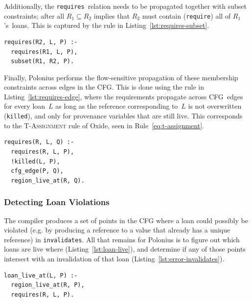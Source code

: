 \documentclass[11pt,a4paper,twoside,openany,draft]{report}
\newenvironment{sourcecode}{\captionsetup{type=listing}}{}
\newcommand{\InDatalog}[1]{\texttt{#1}}
\begin{document}
Additionally, the \InDatalog{requires}~relation needs to be propagated together
with subset constraints; after all $R_1 \subseteq R_2$ implies that $R_2$ must
contain (\InDatalog{require}) all of $R_1$'s~loans. This is captured by the rule
in Listing~\ref{lst:requires-subset}.

\begin{sourcecode}
  \label{lst:requires-subset}
\begin{verbatim}
requires(R2, L, P) :- 
  requires(R1, L, P), 
  subset(R1, R2, P).
\end{verbatim}
\end{sourcecode}

Finally, Polonius performs the flow-sensitive propagation of these membership
constraints across edges in the CFG. This is done using the rule in
Listing~\ref{lst:requires-edge}, where the requirements propagate across
CFG~edges for every loan~$L$ as long as the reference corresponding to~$L$ is
not overwritten (\InDatalog{killed}), and only for provenance variables that are
still live. This corresponds to the \textsc{T-Assignment} rule of Oxide, seen in
Rule~\eqref{eq:t-assignment}.

\begin{sourcecode}
  \label{lst:requires-edge}
\begin{verbatim}
requires(R, L, Q) :-
  requires(R, L, P),
  !killed(L, P),
  cfg_edge(P, Q),
  region_live_at(R, Q).
\end{verbatim}
\end{sourcecode}


\subsubsection{Detecting Loan Violations}

The compiler produces a set of points in the CFG where a loan could possibly be
violated (e.g. by producing a reference to a value that already has a unique
reference) in \InDatalog{invalidates}. All that remains for Polonius is to
figure out which loans are live where (Listing~\ref{lst:loan-live}), and
determine if any of those points intersect with an invalidation of that loan
(Listing~\ref{lst:error-invalidates}).

\begin{sourcecode}
  \label{lst:loan-live}
\begin{verbatim}
loan_live_at(L, P) :-
  region_live_at(R, P),
  requires(R, L, P).
\end{verbatim}
\end{sourcecode}
\end{document}
